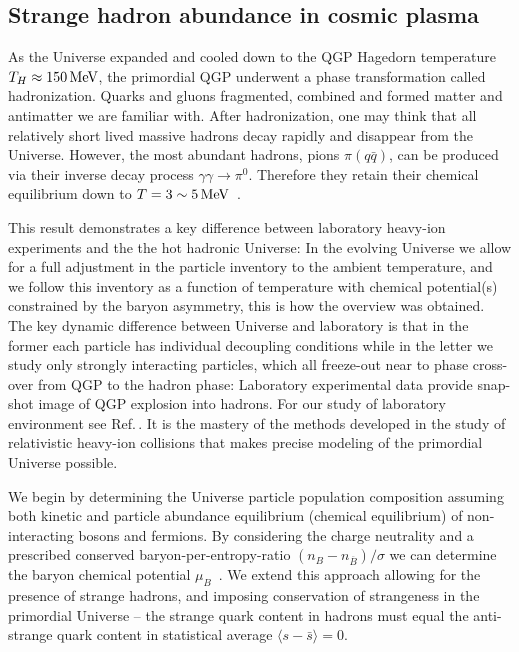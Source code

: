\subsection{Strange hadron abundance in cosmic plasma}
\label{Strangeness}
As the Universe expanded and cooled down to the QGP Hagedorn temperature $T_H\approx150\text{\,MeV}$, the primordial QGP underwent a phase transformation called hadronization. Quarks and gluons fragmented, combined and formed matter and antimatter we are familiar with. After hadronization, one may think that all relatively short lived massive hadrons decay rapidly and disappear from the Universe. However, the most abundant hadrons, pions $\pi(q\bar q)$, can be produced via their inverse decay process $\gamma\gamma\rightarrow\pi^0$. Therefore they retain their chemical equilibrium down to $T=3\sim5\text{\,MeV}$~\cite{Kuznetsova:2008jt}. 

{\color{blue} This result demonstrates a key difference between laboratory heavy-ion experiments and the the hot hadronic Universe: In the evolving Universe we allow for a full adjustment in the particle inventory to the ambient temperature, and we follow this inventory as a function of temperature with chemical potential(s) constrained by the baryon asymmetry, this is how the overview  was obtained. The key dynamic difference between Universe and laboratory is that in the former each particle has individual decoupling conditions while in the letter we study only strongly interacting particles, which all freeze-out near to phase cross-over from QGP to the hadron phase: Laboratory experimental data provide snap-shot image of QGP explosion into hadrons. For our study of laboratory environment see Ref.\,\cite{Letessier:2005qe,Petran:2013qla,Rafelski:2014cqa}. It is the mastery of the methods developed in the study of relativistic heavy-ion collisions that makes precise modeling of the primordial Universe possible.}

We begin by determining the Universe particle population composition assuming both kinetic and particle abundance equilibrium (chemical equilibrium) of non-interacting bosons and fermions. By considering the charge neutrality and a prescribed conserved baryon-per-entropy-ratio ${(n_B-n_{\overline{B}})}/{\sigma}$ we can determine the baryon chemical potential $\mu_B$~\cite{Fromerth:2002wb,Fromerth:2012fe,Rafelski:2013yka}. We extend this approach allowing for the presence of strange hadrons, and imposing conservation of strangeness in the primordial Universe -- the strange quark content in hadrons must equal the anti-strange quark content in statistical average $\langle s-\bar s \rangle=0$. 

